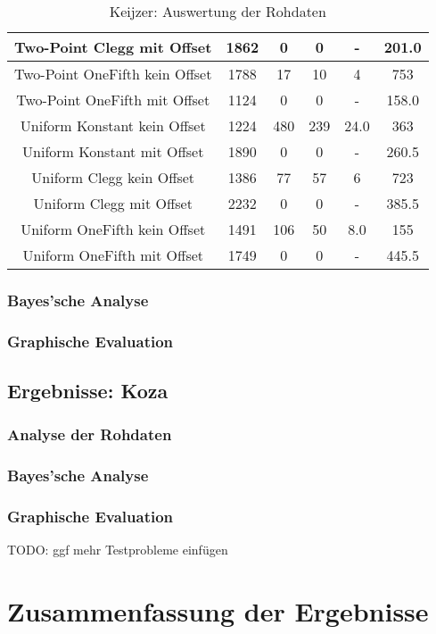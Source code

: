 \begin{table}[H]
\begin{tabular}{c | c | c | c | c | c }
		\hline
		Two-Point Clegg mit Offset & 1862 & 0 & 0 & - & 201.0\\
		\hline
		Two-Point OneFifth kein Offset & 1788 & 17 & 10 & 4 & 753\\
		\hline
		Two-Point OneFifth mit Offset & 1124 & 0 & 0 & - & 158.0\\
		\hline
		Uniform Konstant kein Offset & 1224 & 480 & 239 & 24.0 & 363\\
		\hline
		Uniform Konstant mit Offset & 1890 & 0 & 0 & - & 260.5\\
		\hline
		Uniform Clegg kein Offset & 1386 & 77 & 57 & 6 & 723\\
		\hline
		Uniform Clegg mit Offset & 2232 & 0 & 0 & - & 385.5\\
		\hline
		Uniform OneFifth kein Offset & 1491 & 106 & 50 & 8.0 & 155\\
		\hline
		Uniform OneFifth mit Offset & 1749 & 0 & 0 & - & 445.5\\
	\end{tabular}
	\caption{Keijzer: Auswertung der Rohdaten}
	\label{table:keijzerRohdaten}
\end{table}

\subsubsection{Bayes'sche Analyse}
\label{keijzer:bayes}
\subsubsection{Graphische Evaluation}
\label{keijzer: graphische Evaluation}


\subsection{Ergebnisse: Koza}
\label{subsec:ergebnisseKoza}
\subsubsection{Analyse der Rohdaten}
\label{koza:analyseRohdaten}
\subsubsection{Bayes'sche Analyse}
\label{koza:bayes}
\subsubsection{Graphische Evaluation}
\label{koza: graphische Evaluation}

TODO: ggf mehr Testprobleme einfügen

\section{Zusammenfassung der Ergebnisse}
\label{sec:zusammenfassungErgebnisse}
